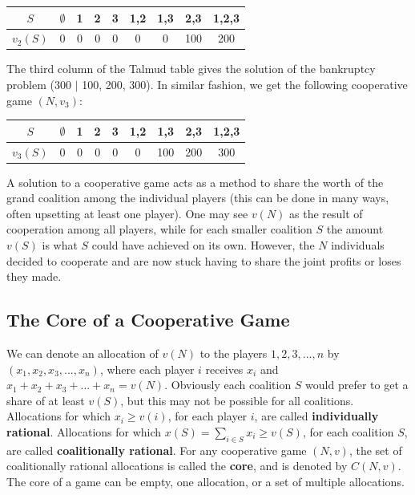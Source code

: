 \documentclass[12pt]{article}
\begin{document}
\begin{table}[h]
    \centering
    \begin{tabular}{|c|cccccccc|}
    \hline
    $S$ & $\emptyset$ & 1 & 2 & 3 & 1,2 & 1,3 & 2,3 & 1,2,3 \\ \hline
    $v_2(S)$ & 0 & 0 & 0 & 0 & 0 & 0 & 100 & 200 \\ \hline
    \end{tabular}
\end{table}

\newpage
\noindent
The third column of the Talmud table gives the solution of the bankruptcy problem (300 $|$ 100, 200, 300).
In similar fashion, we get the following cooperative game $(N, v_3)$:

\begin{table}[h]
    \centering
    \begin{tabular}{|c|cccccccc|}
    \hline
    $S$ & $\emptyset$ & 1 & 2 & 3 & 1,2 & 1,3 & 2,3 & 1,2,3 \\ \hline
    $v_3(S)$ & 0 & 0 & 0 & 0 & 0 & 100 & 200 & 300 \\ \hline
    \end{tabular}
\end{table}

\noindent
A solution to a cooperative game acts as a method to share the worth of the grand coalition among the individual players (this can be done in many ways, often upsetting at least one player).
One may see $v(N)$ as the result of cooperation among all players, while for each smaller coalition $S$ the amount $v(S)$ is what $S$ could have achieved on its own.
However, the $N$ individuals decided to cooperate and are now stuck having to share the joint profits or loses they made.

\subsection{The Core of a Cooperative Game}
We can denote an allocation of $v(N)$ to the players $1, 2, 3, ..., n$ by $(x_1, x_2, x_3, ..., x_n)$, where each player $i$ receives $x_i$ and $x_1 + x_2 + x_3 + ... + x_n = v(N)$.
Obviously each coalition $S$ would prefer to get a share of at least $v(S)$, but this may not be possible for all coalitions.
Allocations for which $x_i \geq v(i)$, for each player $i$, are called \textbf{individually rational}.
Allocations for which $x(S) = \sum_{i \in S} x_i \geq v(S)$, for each coalition $S$, are called \textbf{coalitionally rational}.
For any cooperative game $(N, v)$, the set of coalitionally rational allocations is called the \textbf{core}, and is denoted by $C(N, v)$.
The core of a game can be empty, one allocation, or a set of multiple allocations.
\end{document}
